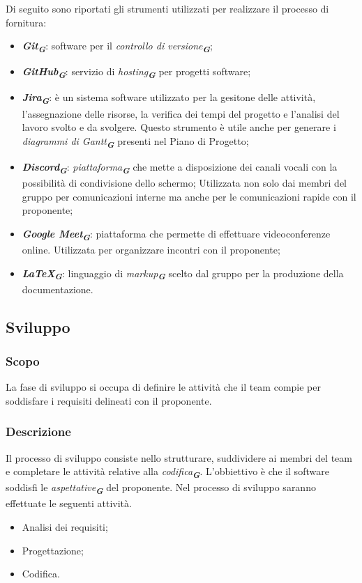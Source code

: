 Di seguito sono riportati gli strumenti utilizzati per realizzare il processo di fornitura:
\begin{itemize}
    \item \textbf{\emph{Git}}\textsubscript{\textit{\textbf{G}}}: software per il \emph{controllo di versione}\textsubscript{\textit{\textbf{G}}};
    \item \textbf{\emph{GitHub}}\textsubscript{\textit{\textbf{G}}}: servizio di \emph{hosting}\textsubscript{\textit{\textbf{G}}} per progetti software;
    \item \textbf{\emph{Jira}}\textsubscript{\textit{\textbf{G}}}: è un sistema software utilizzato per la gesitone delle attività, l’assegnazione delle
    risorse, la verifica dei tempi del progetto e l’analisi del lavoro svolto e da svolgere.
    Questo strumento è utile anche per generare i \emph{diagrammi di Gantt}\textsubscript{\textit{\textbf{G}}} presenti nel Piano
    di Progetto;
    \item \textbf{\emph{Discord}}\textsubscript{\textit{\textbf{G}}}: \emph{piattaforma}\textsubscript{\textit{\textbf{G}}} che mette a disposizione dei canali vocali con la possibilità di condivisione dello schermo;
    Utilizzata non solo dai membri del gruppo per comunicazioni interne ma anche per le comunicazioni rapide con il proponente;
    \item \textbf{\emph{Google Meet}}\textsubscript{\textit{\textbf{G}}}: piattaforma che permette di effettuare videoconferenze online. Utilizzata per organizzare incontri con il proponente;
    \item \textbf{\emph{\LaTeX}}\textsubscript{\textit{\textbf{G}}}: linguaggio di \emph{markup}\textsubscript{\textit{\textbf{G}}} scelto dal gruppo per la produzione della documentazione.
\end{itemize}

\subsection{Sviluppo}
\subsubsection{Scopo}
La fase di sviluppo si occupa di definire le attività che il team compie per soddisfare i requisiti delineati con il proponente.

\subsubsection{Descrizione}
Il processo di sviluppo consiste nello strutturare, suddividere ai membri del team e completare le attività relative alla \emph{codifica}\textsubscript{\textit{\textbf{G}}}. L’obbiettivo è che il software soddisfi le \emph{aspettative}\textsubscript{\textit{\textbf{G}}} del proponente.
Nel processo di sviluppo saranno effettuate le seguenti attività.
\begin{itemize}
    \item Analisi dei requisiti;
    \item Progettazione;
    \item Codifica.
\end{itemize}

